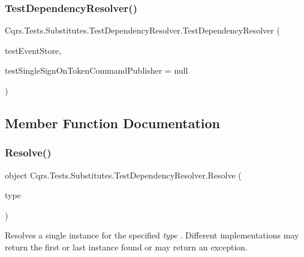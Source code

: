\subsubsection{\texorpdfstring{Test\+Dependency\+Resolver()}{TestDependencyResolver()}}
{\footnotesize\ttfamily Cqrs.\+Tests.\+Substitutes.\+Test\+Dependency\+Resolver.\+Test\+Dependency\+Resolver (\begin{DoxyParamCaption}\item[{\hyperlink{classCqrs_1_1Tests_1_1Substitutes_1_1TestEventStore}{Test\+Event\+Store}}]{test\+Event\+Store,  }\item[{\hyperlink{interfaceCqrs_1_1Commands_1_1ICommandPublisher}{I\+Command\+Publisher}$<$ \hyperlink{interfaceCqrs_1_1Authentication_1_1ISingleSignOnToken}{I\+Single\+Sign\+On\+Token} $>$}]{test\+Single\+Sign\+On\+Token\+Command\+Publisher = {\ttfamily null} }\end{DoxyParamCaption})}



\subsection{Member Function Documentation}
\mbox{\label{classCqrs_1_1Tests_1_1Substitutes_1_1TestDependencyResolver_a05767824475ea6affbf6f70cf5b1fd06_a05767824475ea6affbf6f70cf5b1fd06}} 
\subsubsection{\texorpdfstring{Resolve()}{Resolve()}}
{\footnotesize\ttfamily object Cqrs.\+Tests.\+Substitutes.\+Test\+Dependency\+Resolver.\+Resolve (\begin{DoxyParamCaption}\item[{Type}]{type }\end{DoxyParamCaption})}



Resolves a single instance for the specified {\itshape type} . Different implementations may return the first or last instance found or may return an exception. 


